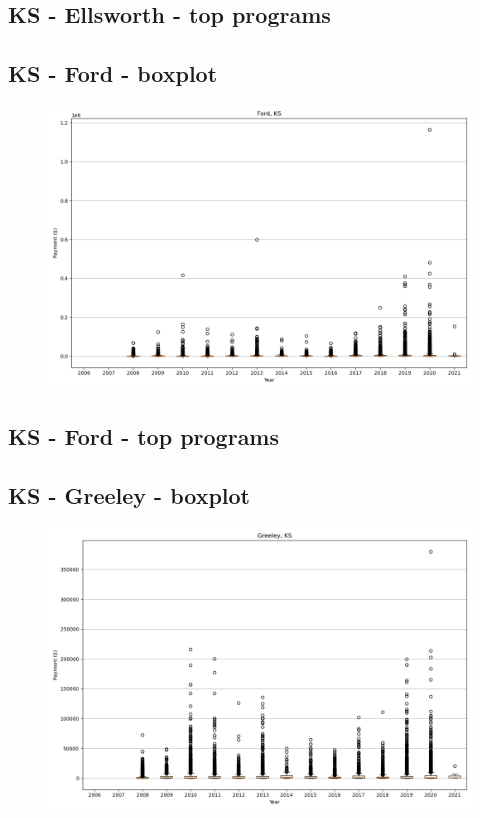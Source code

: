 \subsection*{KS - Ellsworth - top programs}

\newpage
\subsection*{KS - Ford - boxplot}
\begin{figure}[h]
\centering
\includegraphics[width=7in]{../output/boxplots/counties/Ford-KS_boxplot.png}
\end{figure}


\subsection*{KS - Ford - top programs}

\newpage
\subsection*{KS - Greeley - boxplot}
\begin{figure}[h]
\centering
\includegraphics[width=7in]{../output/boxplots/counties/Greeley-KS_boxplot.png}
\end{figure}


